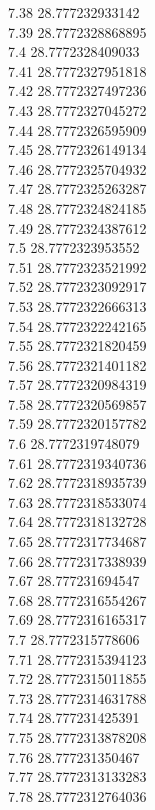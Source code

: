 {7.38	28.777232933142\\
7.39	28.7772328868895\\
7.4	28.7772328409033\\
7.41	28.7772327951818\\
7.42	28.7772327497236\\
7.43	28.7772327045272\\
7.44	28.7772326595909\\
7.45	28.7772326149134\\
7.46	28.7772325704932\\
7.47	28.7772325263287\\
7.48	28.7772324824185\\
7.49	28.7772324387612\\
7.5	28.7772323953552\\
7.51	28.7772323521992\\
7.52	28.7772323092917\\
7.53	28.7772322666313\\
7.54	28.7772322242165\\
7.55	28.7772321820459\\
7.56	28.7772321401182\\
7.57	28.7772320984319\\
7.58	28.7772320569857\\
7.59	28.7772320157782\\
7.6	28.7772319748079\\
7.61	28.7772319340736\\
7.62	28.7772318935739\\
7.63	28.7772318533074\\
7.64	28.7772318132728\\
7.65	28.7772317734687\\
7.66	28.7772317338939\\
7.67	28.777231694547\\
7.68	28.7772316554267\\
7.69	28.7772316165317\\
7.7	28.7772315778606\\
7.71	28.7772315394123\\
7.72	28.7772315011855\\
7.73	28.7772314631788\\
7.74	28.777231425391\\
7.75	28.7772313878208\\
7.76	28.777231350467\\
7.77	28.7772313133283\\
7.78	28.7772312764036\\
}
